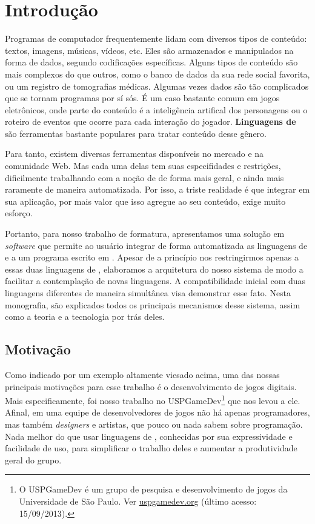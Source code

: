 
\chapter{Introdução}
\label{sec:intr}

Programas de computador frequentemente lidam com diversos tipos de conteúdo:
textos, imagens, músicas, vídeos, etc. Eles são armazenados e manipulados na
forma de dados, segundo codificações específicas. Alguns tipos de conteúdo são
mais complexos do que outros, como o banco de dados da sua rede social favorita,
ou um registro de tomografias médicas. Algumas vezes dados são tão
complicados que se tornam programas por sí sós. É um caso bastante comum em
jogos eletrônicos, onde parte do conteúdo é a inteligência artifical dos
personagens ou o roteiro de eventos que ocorre para cada interação do jogador.
\textbf{Linguagens de \script{}} são ferramentas bastante populares para tratar
conteúdo desse gênero.

Para tanto, existem diversas ferramentas disponíveis no mercado e na comunidade
Web. Mas cada uma delas tem suas especifidades e restrições, dificilmente
trabalhando com a noção de  de forma mais geral, e ainda mais
raramente de maneira automatizada. Por isso, a triste realidade é que integrar
 em sua aplicação, por mais valor que isso agregue ao seu conteúdo,
exige muito esforço.

Portanto, para nosso trabalho de formatura, apresentamos uma solução em
\textit{software} que permite ao usuário integrar de forma automatizada as
linguagens de \script{}  e  a um programa escrito em
\CXX{}. Apesar de a princípio nos restringirmos apenas a essas duas linguagens
de \script{}, elaboramos a arquitetura do nosso sistema de modo a facilitar
a contemplação de novas linguagens. A compatibilidade inicial com duas
linguagens diferentes de maneira simultânea visa demonstrar esse fato. Nesta
monografia, são explicados todos os principais mecanismos desse sistema, assim
como a teoria e a tecnologia por trás deles.

\section{Motivação}
\label{sec:intr:motivacao}

Como indicado por um exemplo altamente viesado acima, uma das nossas principais
motivações para esse trabalho é o desenvolvimento de jogos digitais. Mais
especificamente, foi nosso trabalho no USPGameDev\footnote{
  O USPGameDev é um grupo de pesquisa e desenvolvimento de jogos da
  Universidade de São Paulo. Ver \url{uspgamedev.org} (último acesso: 
  15/09/2013).
} que nos levou a ele. Afinal, em uma equipe de desenvolvedores de jogos não
há apenas programadores, mas também \textit{designers} e artistas, que pouco
ou nada sabem sobre programação. Nada melhor do que usar linguagens de
\script{}, conhecidas por sua expressividade e facilidade de uso, para
simplificar o trabalho deles e aumentar a produtividade geral do grupo.

